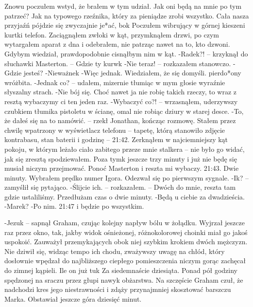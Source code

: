 \documentclass[../MAIN.tex]{subfiles}
\begin{document}
Znowu poczułem wstyd, że brałem w tym udział. Jak oni będą na mnie po tym patrzeć? Jak na typowego rzeźnika, który za pieniądze zrobi wszystko. Cała nasza przyjaźń pójdzie się zwyczajnie je*ać, bo\3k
Poczułem wibrujący w górnej kieszeni kurtki telefon. Zaciągnąłem zwłoki w kąt, przymknąłem drzwi, po czym wytargałem aparat z dna i odebrałem, nie patrząc nawet na to, kto dzwoni.
Gdybym wiedział, prawdopodobnie cisnąłbym nim w kąt.
-Radek?! -- krzyknął do słuchawki Masterton. -- Gdzie ty kurw\3k
-Nie teraz! -- rozkazałem stanowczo.
-Gdzie jesteś?
-Nieważne\3k
-Więc jednak.
Wiedziałem, że się domyśli. pierdo*ony wróżbita.
-Jednak co? -- udałem, mizernie tłumiąc w mym głosie wyraźnie słyszalny strach.
-Nie bój się. Choć nawet ja nie robię takich rzeczy, to wraz z resztą wybaczymy ci ten jeden raz.
-Wybaczyć co?! -- wrzasnąłem, uderzywszy czubkiem tłumika pistoletu w ścianę, omal nie robiąc dziury w starej desce.
-To, że dałeś się na to namówić. -- rzekł Jonathan, kończąc rozmowę.
Stałem przez chwilę wpatrzony w wyświetlacz telefonu -- tapetę, którą stanowiło zdjęcie kontrabasu, stan baterii i godzinę -- 21:42. Zerknąłem w najciemniejszy kąt pokoju, w którym leżało ciało zabitego przeze mnie stalkera -- nie było go widać, jak się zresztą spodziewałem. Poza tym\3k jeszcze trzy minuty i już nie będę się musiał niczym przejmować. Ponoć Masterton i reszta mi wybaczy.
21:43. Dwie minuty.
Wybrałem prędko numer Igora. Odezwał się po pierwszym sygnale.
-I\3k? -- zamyślił się pytająco.
-Ślijcie ich. -- rozkazałem. -- Dwóch do mnie, reszta tam gdzie ustaliliśmy. Przedłużam czas o dwie minuty.
-Będą u ciebie za dwadzieścia.
-Marek?
-Po nim.
21:47 i będzie po wszystkim.



-Jezu\3k -- sapnął Graham, czując kolejny napływ bólu w żołądku. Wyjrzał jeszcze raz przez okno, tak, jakby widok ośnieżonej, różnokolorowej choinki miał go jakoś uspokoić. Zauważył przemykających obok niej szybkim krokiem dwóch mężczyzn. Nie dziwił się, widząc tempo ich chodu, zważywszy uwagę na chłód, który dosłownie wpędzał do najbliższego ciepłego pomieszczenia niczym gorąc zachęcał do zimnej kąpieli.
Ile on już tu\3k
Za siedemnaście dziesiąta. Ponad pół godziny spędzonej na sraczu przez głupi nawyk obżarstwa. Na szczęście Graham czuł, że nadchodzi kres jego niestrawności i zdąży przynajmniej skosztować barszczu Marka.
Obstawiał jeszcze góra dziesięć minut.
\end{document}

